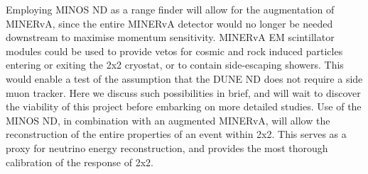 Employing MINOS ND as a range finder will allow for the augmentation of MINERvA, since the entire MINERvA detector would no longer be needed downstream to maximise momentum sensitivity.
MINERvA EM scintillator modules could be used to provide vetos for cosmic and rock induced particles entering or exiting the 2x2 cryostat, or to contain side-escaping showers. 
This would enable a test of the assumption that the DUNE ND does not require a side muon tracker. 
Here we discuss such possibilities in brief, and will wait to discover the viability of this project before embarking on more detailed studies.
Use of the MINOS ND, in combination with an augmented MINERvA, will allow the reconstruction of the entire properties of an event within 2x2.
This serves as a proxy for neutrino energy reconstruction, and provides the most thorough calibration of the response of 2x2.  
